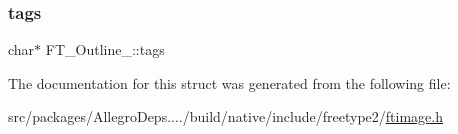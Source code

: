 \mbox{\label{struct_f_t___outline___ac84ca66907361e1f49ec11c14720087a}} 
\subsubsection{\texorpdfstring{tags}{tags}}
{\footnotesize\ttfamily char$\ast$ F\+T\+\_\+\+Outline\+\_\+\+::tags}



The documentation for this struct was generated from the following file\+:\begin{DoxyCompactItemize}
\item 
src/packages/\+Allegro\+Deps..../build/native/include/freetype2/\hyperlink{ftimage_8h}{ftimage.\+h}\end{DoxyCompactItemize}

